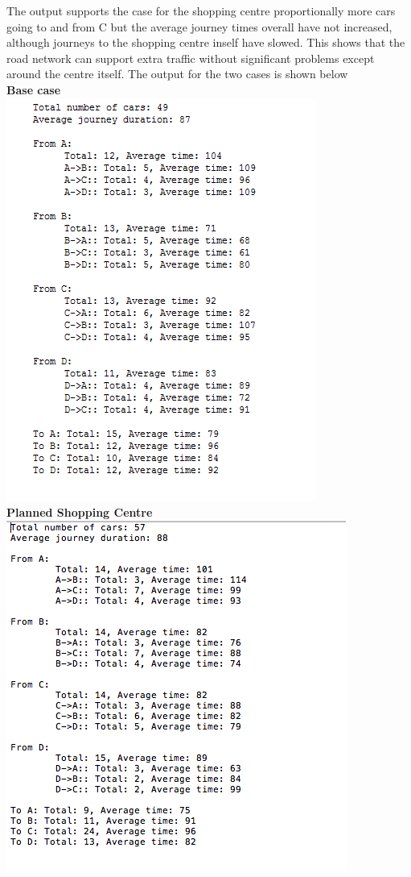    The output supports the case for the shopping centre  proportionally more cars going to and from C but the average journey times overall have not increased, although journeys to the shopping centre inself have slowed. This shows that the road network can support extra traffic without significant problems except around the centre itself.  The output for the two cases is shown below\\ \newpage \textbf{Base case}\\
    \includegraphics[scale=0.8]{./images/scenario1.png}\\ \newpage \textbf{Planned Shopping Centre}\\
    \includegraphics[scale=0.8]{./images/scenario2_1.png}
    
